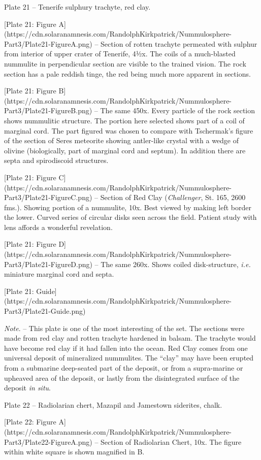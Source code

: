 \documentclass[a4paper, 12pt, oneside]{article}
\begin{document}
Plate 21 -- Tenerife sulphury trachyte, red clay.

[Plate 21: Figure A](https://cdn.solaranamnesis.com/RandolphKirkpatrick/Nummulosphere-Part3/Plate21-FigureA.png) -- Section of rotten trachyte permeated with sulphur from interior of upper crater of Tenerife, 4½x. The coils of a much-blasted nummulite in perpendicular section are visible to the trained vision. The rock section has a pale reddish tinge, the red being much more apparent in sections.

[Plate 21: Figure B](https://cdn.solaranamnesis.com/RandolphKirkpatrick/Nummulosphere-Part3/Plate21-FigureB.png) -- The same 450x. Every particle of the rock section shows nummulitic structure. The portion here selected shows part of a coil of marginal cord. The part figured was chosen to compare with Tschermak's figure of the section of Seres meteorite showing antler-like crystal with a wedge of olivine (biologically, part of marginal cord and septum). In addition there are septa and spirodiscoid structures.

[Plate 21: Figure C](https://cdn.solaranamnesis.com/RandolphKirkpatrick/Nummulosphere-Part3/Plate21-FigureC.png) -- Section of Red Clay (\emph{Challenger}, St. 165, 2600 fms.). Showing portion of a nummulite, 10x. Best viewed by making left border the lower. Curved series of circular disks seen across the field. Patient study with lens affords a wonderful revelation.

[Plate 21: Figure D](https://cdn.solaranamnesis.com/RandolphKirkpatrick/Nummulosphere-Part3/Plate21-FigureD.png) -- The same 260x. Shows coiled disk-structure, \emph{i.e.} miniature marginal cord and septa.

[Plate 21: Guide](https://cdn.solaranamnesis.com/RandolphKirkpatrick/Nummulosphere-Part3/Plate21-Guide.png)

\emph{Note}. -- This plate is one of the most interesting of the set. The sections were made from red clay and rotten trachyte hardened in balsam. The trachyte would have become red clay if it had fallen into the ocean. Red Clay comes from one universal deposit of mineralized nummulites. The ``clay'' may have been erupted from a submarine deep-seated part of the deposit, or from a supra-marine or upheaved area of the deposit, or lastly from the disintegrated surface of the deposit \emph{in situ}.

Plate 22 -- Radiolarian chert, Mazapil and Jamestown siderites, chalk.

[Plate 22: Figure A](https://cdn.solaranamnesis.com/RandolphKirkpatrick/Nummulosphere-Part3/Plate22-FigureA.png) -- Section of Radiolarian Chert, 10x. The figure within white square is shown magnified in B.
\end{document}

